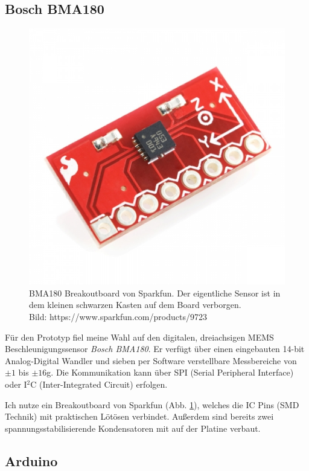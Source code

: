 \documentclass[12pt,a4paper,twoside,BCOR=12.5mm]{scrartcl}
\begin{document}
\subsection{Bosch BMA180}
\begin{figure}[ht]
\centering
\includegraphics[scale=.4]{hardwareimages/bma180_breakout.jpg}
\caption{BMA180 Breakoutboard von Sparkfun. Der eigentliche Sensor ist in dem kleinen schwarzen Kasten auf dem Board verborgen.\\ Bild: https://www.sparkfun.com/products/9723}
\label{bma180_breakout}
\end{figure}

Für den Prototyp fiel meine Wahl auf den digitalen, dreiachsigen MEMS Beschleunigungssensor \textit{Bosch BMA180}. Er verfügt über einen eingebauten 14-bit Analog-Digital Wandler und sieben per Software verstellbare Messbereiche von $\pm1$ bis $\pm16$g.
Die Kommunikation kann über SPI (Serial Peripheral Interface)  oder I$^2$C (Inter-Integrated Circuit) erfolgen.

Ich nutze ein Breakoutboard von Sparkfun (Abb. \ref{bma180_breakout}), welches die IC Pins (SMD Technik) mit praktischen Lötösen verbindet. Außerdem sind bereits zwei spannungsstabilisierende Kondensatoren mit auf der Platine verbaut.

\subsection{Arduino}
\end{document}
